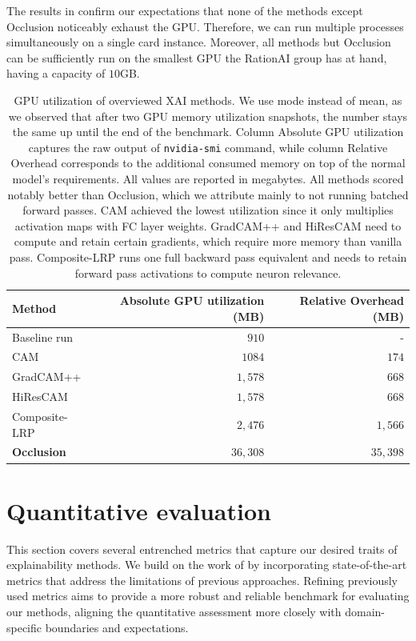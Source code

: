 The results in  confirm our expectations that none of the methods except Occlusion noticeably exhaust the GPU.
Therefore, we can run multiple processes simultaneously on a single card instance.
Moreover, all methods but Occlusion can be sufficiently run on the smallest GPU the RationAI group has at hand, having a capacity of $10$GB.
\begin{table}
\centering
{}
\begin{tabular}{@{} l r r @{}}\toprule
Method & Absolute GPU utilization (MB) & Relative Overhead (MB) \\ 
\midrule
Baseline run       & $910$      & -       \\
CAM                & $1084$     & $174$   \\
GradCAM++          & $1,578$     & $668$   \\
HiResCAM           & $1,578$     & $668$   \\
Composite-LRP      & $2,476$     & $1,566$  \\
\textbf{Occlusion} & $36,308$    & $35,398$ \\
\bottomrule
\end{tabular}
\caption{
GPU utilization of overviewed XAI methods. We use mode instead of mean, as we observed that after two GPU memory utilization snapshots, the number stays the same up until the end of the benchmark. Column Absolute GPU utilization captures the raw output of \texttt{nvidia-smi} command, while column Relative Overhead corresponds to the additional consumed memory on top of the normal model's requirements. All values are reported in megabytes. All methods scored notably better than Occlusion, which we attribute mainly to not running batched forward passes. CAM achieved the lowest utilization since it only multiplies activation maps with FC layer weights. GradCAM++ and HiResCAM need to compute and retain certain gradients, which require more memory than vanilla pass. Composite-LRP runs one full backward pass equivalent and needs to retain forward pass activations to compute neuron relevance.
}
\label{tab:gpu-util}
\end{table}


\section{Quantitative evaluation}

This section covers several entrenched metrics that capture our desired traits of explainability methods.
We build on the work of \cite{gallo} by incorporating state-of-the-art metrics that address the limitations of previous approaches.
Refining previously used metrics aims to provide a more robust and reliable benchmark for evaluating our methods, aligning the quantitative assessment more closely with domain-specific boundaries and expectations.

